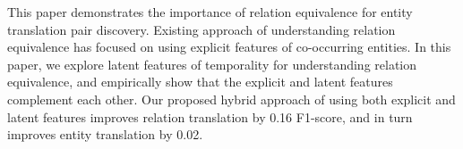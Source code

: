 This paper demonstrates the importance of relation equivalence for entity translation pair discovery. Existing approach of understanding relation equivalence has focused on using explicit features of co-occurring entities. In this paper, we explore latent features of temporality for understanding relation equivalence, and empirically show that the explicit and latent features complement each other. Our proposed hybrid approach of using both explicit and latent features improves relation translation by 0.16 F1-score, and in turn improves entity translation by 0.02.
